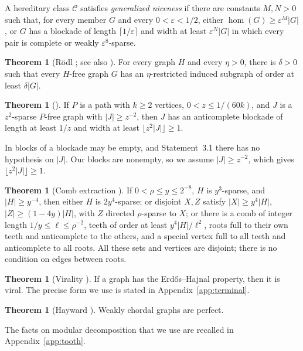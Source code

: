 \documentclass[11pt,a4paper]{article}
\theoremstyle{definition}
\newtheorem{contract}[theorem]{Theorem}
\theoremstyle{remark}
\numberwithin{equation}{section}
\begin{document}
A hereditary class \(\mathcal C\) satisfies \emph{generalized niceness} if there are constants \(M,N>0\) such that, for every member \(G\) and every \(0<\varepsilon<1/2\), either \(\hom(G)\ge\varepsilon^{M}|G|\), or \(G\) has a blockade of length \(\lceil1/\varepsilon\rceil\) and width at least \(\varepsilon^{N}|G|\) in which every pair is complete or weakly \(\varepsilon^{8}\)-sparse.

\begin{contract}[R\"odl \cite{rodl}; see also \cite{nss7}]\label{con:rodl}
For every graph \(H\) and every \(\eta>0\), there is \(\delta>0\) such that every \(H\)-free graph \(G\) has an \(\eta\)-restricted induced subgraph of order at least \(\delta|G|\).
\end{contract}
\begin{contract}[{\cite[Statement 3.1]{nss}}]\label{con:path}
If \(P\) is a path with \(k\ge2\) vertices, \(0<z\le1/(60k)\), and \(J\) is a \(z^2\)-sparse \(P\)-free graph with \(|J|\ge z^{-2}\), then \(J\) has an anticomplete blockade of length at least \(1/z\) and width at least \(\lfloor z^2|J|\rfloor\ge1\).
\end{contract}
In \cite{nss} blocks of a blockade may be empty, and Statement~3.1 there has no hypothesis on \(|J|\). Our blocks are nonempty, so we assume \(|J|\ge z^{-2}\), which gives \(\lfloor z^2|J|\rfloor\ge1\).


\begin{contract}[Comb extraction {\cite[Lemma 2.10]{hjz}}]\label{con:comb}
If \(0<\rho\le y\le2^{-8}\), \(H\) is \(y^3\)-sparse, and \(|H|\ge y^{-4}\), then either \(H\) is \(2y^4\)-sparse; or disjoint \(X,Z\) satisfy \(|X|\ge y^4|H|\), \(|Z|\ge(1-4y)|H|\), with \(Z\) directed \(\rho\)-sparse to \(X\); or there is a comb of integer length \(1/y\le\ell\le\rho^{-2}\), teeth of order at least \(y^4|H|/\ell^2\), roots full to their own teeth and anticomplete to the others, and a special vertex full to all teeth and anticomplete to all roots. All these sets and vertices are disjoint; there is no condition on edges between roots.
\end{contract}
\begin{contract}[Virality {\cite[Theorem 4]{bfp}}]\label{con:viral}
If a graph has the Erd\H{o}s--Hajnal property, then it is viral. The precise form we use is stated in Appendix~\ref{app:terminal}.
\end{contract}
\begin{contract}[Hayward \cite{hayward}]\label{con:hayward}
Weakly chordal graphs are perfect.
\end{contract}
The facts on modular decomposition that we use are recalled in Appendix~\ref{app:tooth}.
\end{document}
